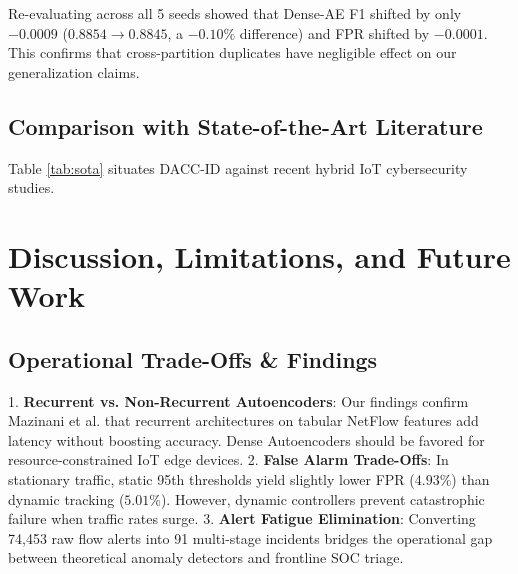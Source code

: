 \documentclass{ieeeaccess}
\begin{document}
Re-evaluating across all 5 seeds showed that Dense-AE F1 shifted by only $-0.0009$ ($0.8854 \to 0.8845$, a $-0.10\%$ difference) and FPR shifted by $-0.0001$. This confirms that cross-partition duplicates have negligible effect on our generalization claims.

\subsection{Comparison with State-of-the-Art Literature}
Table \ref{tab:sota} situates DACC-ID against recent hybrid IoT cybersecurity studies.

\begin{table}[htbp]
\caption{Systemic Comparison with Recent IoT Cybersecurity Studies}
\label{tab:sota}
\centering
{}
\end{table}

\section{Discussion, Limitations, and Future Work}
\label{sec:discussion}

\subsection{Operational Trade-Offs & Findings}
1. \textbf{Recurrent vs. Non-Recurrent Autoencoders}: Our findings confirm Mazinani et al. \cite{mazinani2026} that recurrent architectures on tabular NetFlow features add latency without boosting accuracy. Dense Autoencoders should be favored for resource-constrained IoT edge devices.
2. \textbf{False Alarm Trade-Offs}: In stationary traffic, static 95th thresholds yield slightly lower FPR ($4.93\%$) than dynamic tracking ($5.01\%$). However, dynamic controllers prevent catastrophic failure when traffic rates surge.
3. \textbf{Alert Fatigue Elimination}: Converting 74,453 raw flow alerts into 91 multi-stage incidents bridges the operational gap between theoretical anomaly detectors and frontline SOC triage.
\end{document}
